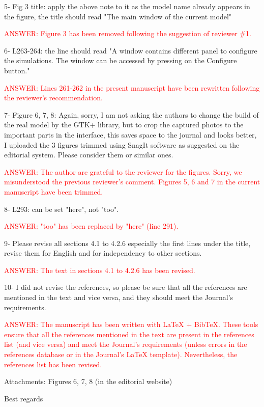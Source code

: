\documentclass[a4paper]{article}
\begin{document}
5-	Fig 3 title: apply the above note to it as the model name already appears in the figure, the title should read "The main window of the current model"

\textcolor{red}{ANSWER: Figure 3 has been removed following the suggestion of reviewer \#1.}

6-	L263-264: the line should read "A window contains different panel to configure the simulations. The window can be accessed by pressing on the Configure button."

\textcolor{red}{ANSWER: Lines 261-262 in the present manuscript have been rewritten following the reviewer's recommendation.}

7-	Figure 6, 7, 8: Again, sorry, I am not asking the authors to change the build of the real model by the GTK+ library, but to crop the captured photos to the important parts in the interface, this saves space to the journal and looks better, I uploaded the 3 figures trimmed using SnagIt software as suggested on the editorial system. Please consider them or similar ones.

\textcolor{red}{ANSWER: The author are grateful to the reviewer for the figures. Sorry, we misunderstood the previous reviewer's comment. Figures 5, 6 and 7 in the current manuscript have been trimmed.}

8-	L293: can be set "here", not "too".

\textcolor{red}{ANSWER: "too" has been replaced by "here" (line 291).}

9-	Please revise all sections 4.1 to 4.2.6 especially the first lines under the title, revise them for English and for independency to other sections.

\textcolor{red}{ANSWER: The text in sections 4.1 to 4.2.6 has been revised.}

10-	I did not revise the references, so please be sure that all the references are mentioned in the text and vice versa, and they should meet the Journal's requirements.

\textcolor{red}{ANSWER: The manuscript has been written with LaTeX + BibTeX. These tools ensure that all the references mentioned in the text are present in the
references list (and vice versa) and meet the Journal's requirements (unless errors in the references database or in the Journal's LaTeX template). Nevertheless, the references list has been revised.}

Attachments: Figures 6, 7, 8 (in the editorial website)

Best regards
\end{document}
